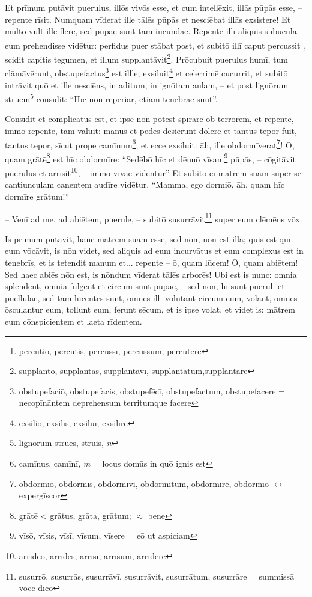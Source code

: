 \documentclass[a4paper, 12pt]{article}
\newcommand{\red}[1]{{\color{red}  {#1}}}
\begin{document}
\begin{linenumbers}
	Et prīmum putāvit puerulus, illōs vivōs esse, et cum intellēxit, illās pūpās esse, -- repente rīsit.
	Numquam vīderat ille tālēs pūpās et nesciēbat illās exsistere!
	Et multō vult ille flēre, sed pūpae sunt tam iūcundae.
	Repente illī aliquis subūculā eum prehendisse vidētur:
	perfidus puer stābat post, et subitō \red{illī} caput percussit\footnote{percutiō, percutis, percussī, percussum, percutere}, scidit capitis tegumen, et illum supplantāvit\footnote{supplantō, supplantās, supplantāvī, supplantātum,supplantāre}.
	Prōcubuit puerulus humī, \red{tum clāmāvērunt}, obstupefactus\footnote{obstupefaciō, obstupefacis, obstupefēcī, obstupefactum, obstupefacere = necopīnāntem deprehensum territumque facere} est illle, exsiluit\footnote{exsiliō, exsilīs, exsiluī, exsilīre} et celerrimē cucurrit, et \red{subitō intrāvit quō et ille nesciēns}, in aditum, in ignōtam aulam, -- et post lignōrum struem\footnote{lignōrum struēs, struis, \textit{n}} cōnsīdit: ``Hīc nōn reperiar, etiam tenebrae sunt''.
	
	Cōnsīdit et complicātus est, et ipse nōn potest spīrāre ob terrōrem, et repente, immō repente, tam valuit: manūs et pedēs dēsiērunt dolēre et tantus tepor fuit, tantus tepor, sīcut prope camīnum\footnote{camīnus, camīnī, \textit{m} = locus domūs in quō ignis est}; et ecce exsiluit: āh, ille obdormīverat\footnote{obdormīo, obdormīs, obdormīvi, obdormītum, obdormīre, obdormīo $\leftrightarrow$ expergīscor}!
	Ō, quam grātē\footnote{grātē < grātus, grāta, grātum; $\approx$ bene} est hīc obdormīre: ``Sedēbō hīc et dēnuō vīsam\footnote{vīsō, vīsis, vīsī, vīsum, vīsere = eō ut aspiciam} pūpās, -- cōgitāvit puerulus et arrīsit\footnote{arrīdeō, arrīdēs, arrīsī, arrīsum, arrīdēre}, -- immō vīvae videntur''
	Et subitō eī mātrem suam super sē cantiunculam canentem audīre vidētur.
	``Mamma, ego dormiō, āh, quam hīc dormīre grātum!''
	
	-- Venī ad me, ad abiētem, puerule, -- subitō susurrāvit\footnote{susurrō, susurrās, susurrāvī, susurrāvit, susurrātum, susurrāre = summissā vōce dīcō} super eum clēmēns vōx.
	
	Is prīmum putāvit, hanc mātrem suam esse, sed nōn, nōn \red{est} illa;
	quis est quī eum vōcāvit, is nōn videt, sed aliquis ad eum incurvātus et eum complexus est in tenebrīs, et is tetendit manum et... repente -- ō, quam lūcem! Ō, quam abiētem!
	Sed haec abiēs nōn est, is nōndum vīderat tālēs arborēs!
	Ubi est is nunc:
	omnia splendent, omnia fulgent et circum sunt pūpae, -- sed nōn, hī sunt puerulī et puellulae, sed tam lūcentes sunt, omnēs illī volūtant circum eum, volant, omnēs ōsculantur eum, tollunt eum, ferunt sēcum, et is ipse volat, et videt is: mātrem eum cōnspicientem et laeta rīdentem.
	

\end{linenumbers}
\end{document}
